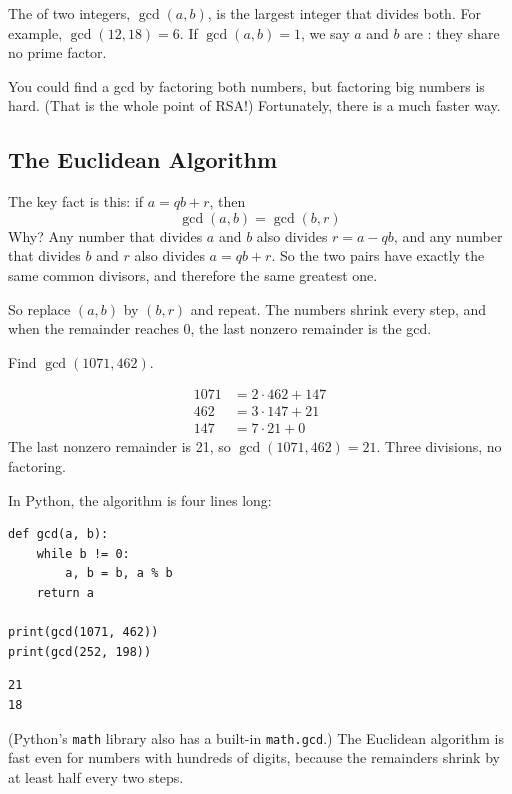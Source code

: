 The  of two integers, $\gcd(a, b)$, is the
largest integer that divides both. For example, $\gcd(12, 18) = 6$. If
$\gcd(a, b) = 1$, we say $a$ and $b$ are : they
share no prime factor.

You could find a gcd by factoring both numbers, but factoring big numbers is
hard. (That is the whole point of RSA!) Fortunately, there is a much faster way.

\subsection{The Euclidean Algorithm}
The key fact is this: if $a = qb + r$, then
$$\gcd(a, b) = \gcd(b, r)$$
Why? Any number that divides $a$ and $b$ also divides $r = a - qb$, and any
number that divides $b$ and $r$ also divides $a = qb + r$. So the two pairs
have exactly the same common divisors, and therefore the same greatest one.

So replace $(a, b)$ by $(b, r)$ and repeat. The numbers shrink every step, and
when the remainder reaches 0, the last nonzero remainder is the gcd.

\begin{Worked}
\begin{Problem}
Find $\gcd(1071, 462)$.
\end{Problem}
\begin{Solution}
\begin{align*}
1071 &= 2 \cdot 462 + 147 \\
462 &= 3 \cdot 147 + 21 \\
147 &= 7 \cdot 21 + 0
\end{align*}
The last nonzero remainder is 21, so $\gcd(1071, 462) = 21$. Three divisions,
no factoring.
\end{Solution}
\end{Worked}

In Python, the algorithm is four lines long:
\begin{verbatim}
def gcd(a, b):
    while b != 0:
        a, b = b, a % b
    return a

print(gcd(1071, 462))
print(gcd(252, 198))
\end{verbatim}
\begin{verbatim}
21
18
\end{verbatim}
(Python's \texttt{math} library also has a built-in
\texttt{math.gcd}.) The Euclidean algorithm is fast even for
numbers with hundreds of digits, because the remainders shrink by at least
half every two steps.

